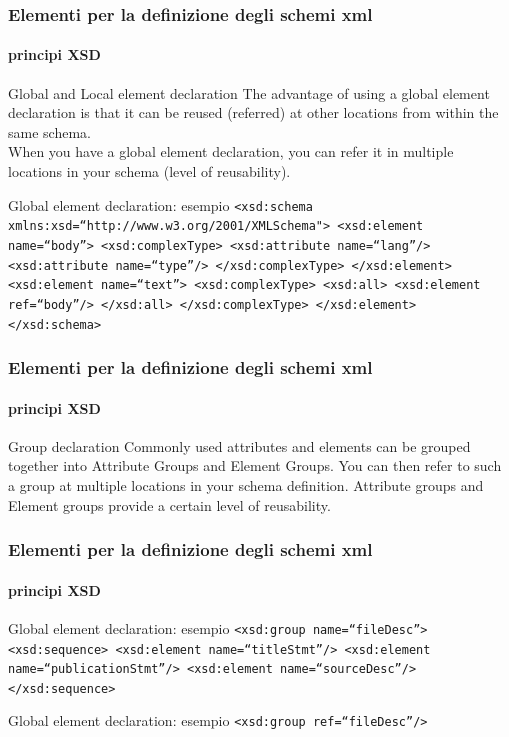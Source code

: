 
\begin{frame}
	\frametitle{Elementi per la definizione degli schemi xml}
	\framesubtitle{principi XSD}
	\addtocounter{nframe}{1}

	\begin{block}{Global and Local element declaration}
		The advantage of using a global element declaration is that it can be reused (referred) at other locations from within the same schema.
		\\ When you have a global element declaration, you can refer it in multiple locations in your schema (level of reusability).
	\end{block}

	\begin{block}{Global element declaration: esempio}
		\texttt{<xsd:schema xmlns:xsd=``http://www.w3.org/2001/XMLSchema">
			<xsd:element name=``body''>
			<xsd:complexType>
			<xsd:attribute name=``lang''/>
			<xsd:attribute name=``type''/>
			</xsd:complexType>
			</xsd:element>
			<xsd:element name=``text''>
			<xsd:complexType>
			<xsd:all>
			<xsd:element ref=``body''/>
			</xsd:all>
			</xsd:complexType>
			</xsd:element>
			</xsd:schema>}
	\end{block}

\end{frame}

\begin{frame}
	\frametitle{Elementi per la definizione degli schemi xml}
	\framesubtitle{principi XSD}
	\addtocounter{nframe}{1}

	\begin{block}{Group declaration}
		Commonly used attributes and elements can be grouped together into Attribute Groups and Element Groups. You can then refer to such a group at multiple locations in your schema definition. Attribute groups and Element groups provide a certain level of reusability.
	\end{block}

\end{frame}



\begin{frame}
	\frametitle{Elementi per la definizione degli schemi xml}
	\framesubtitle{principi XSD}
	\addtocounter{nframe}{1}


	\begin{block}{Global element declaration: esempio}
		\texttt{<xsd:group name=``fileDesc''>
			<xsd:sequence>
			<xsd:element name=``titleStmt''/>
			<xsd:element name=``publicationStmt''/>
			<xsd:element name=``sourceDesc''/>
			</xsd:sequence>
		}
	\end{block}

	\begin{block}{Global element declaration: esempio}
		\texttt{<xsd:group ref=``fileDesc''/>
		}
	\end{block}



\end{frame}

